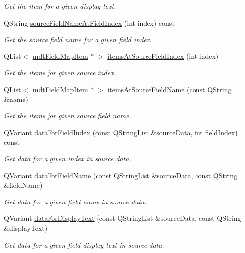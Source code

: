 \begin{DoxyCompactItemize}
\begin{DoxyCompactList}\small\item\em Get the item for a given display text. \end{DoxyCompactList}\item 
QString \hyperlink{classmdt_field_map_a83a1783e11f71b3e0fcea57eaebf97d5}{sourceFieldNameAtFieldIndex} (int index) const 
\begin{DoxyCompactList}\small\item\em Get the source field name for a given field index. \end{DoxyCompactList}\item 
QList$<$ \hyperlink{classmdt_field_map_item}{mdtFieldMapItem} $\ast$ $>$ \hyperlink{classmdt_field_map_a295dc53404eae6b62abaf6ee4fff581b}{itemsAtSourceFieldIndex} (int index)
\begin{DoxyCompactList}\small\item\em Get the items for given source index. \end{DoxyCompactList}\item 
QList$<$ \hyperlink{classmdt_field_map_item}{mdtFieldMapItem} $\ast$ $>$ \hyperlink{classmdt_field_map_a1f84addb64c690fab8fd2c3c48dc91b6}{itemsAtSourceFieldName} (const QString \&name)
\begin{DoxyCompactList}\small\item\em Get the items for given source field name. \end{DoxyCompactList}\item 
QVariant \hyperlink{classmdt_field_map_af9b345ba9bc0b08c149fbd10bad8a818}{dataForFieldIndex} (const QStringList \&sourceData, int fieldIndex) const 
\begin{DoxyCompactList}\small\item\em Get data for a given index in source data. \end{DoxyCompactList}\item 
QVariant \hyperlink{classmdt_field_map_ae5f9e06f49e9bb4d34583da4d342b897}{dataForFieldName} (const QStringList \&sourceData, const QString \&fieldName)
\begin{DoxyCompactList}\small\item\em Get data for a given field name in source data. \end{DoxyCompactList}\item 
QVariant \hyperlink{classmdt_field_map_a62b1087ac4beb5edab79105078f5b91b}{dataForDisplayText} (const QStringList \&sourceData, const QString \&displayText)
\begin{DoxyCompactList}\small\item\em Get data for a given field display text in source data. \end{DoxyCompactList}\item 

\end{DoxyCompactItemize}
